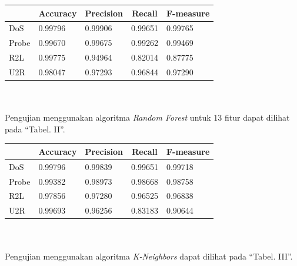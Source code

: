 \documentclass[conference]{IEEEtran}
\begin{document}
\noindent \begin{minipage}{\linewidth}
\begin{center}
\begin{tabular}{|l|l|l|l|l|}
\hline
\multicolumn{1}{|c|}{\textbf{}}&\multicolumn{1}{|c|}{\textbf{Accuracy}}&\multicolumn{1}{|c|}{\textbf{Precision}}&\multicolumn{1}{|c|}{\textbf{Recall}}&\multicolumn{1}{|c|}{\textbf{F-measure}} \\
\hline
DoS & 0.99796 & 0.99906 & 0.99651 & 0.99765\\
\hline
Probe & 0.99670 & 0.99675 & 0.99262 & 0.99469\\
\hline
R2L & 0.99775 & 0.94964 & 0.82014 & 0.87775\\
\hline
U2R & 0.98047 & 0.97293 & 0.96844 & 0.97290\\
\hline
\end{tabular}
\label{tab1}
\end{center}
\end{minipage}\\ \\

\noindent Pengujian menggunakan algoritma \emph{Random Forest} untuk 13 fitur dapat dilihat pada ``Tabel. II''.\vspace{6pt}

\noindent \begin{minipage}{\linewidth}
\begin{center}
\begin{tabular}{|l|l|l|l|l|}
\hline
\multicolumn{1}{|c|}{\textbf{}}&\multicolumn{1}{|c|}{\textbf{Accuracy}}&\multicolumn{1}{|c|}{\textbf{Precision}}&\multicolumn{1}{|c|}{\textbf{Recall}}&\multicolumn{1}{|c|}{\textbf{F-measure}} \\
\hline
DoS & 0.99796 & 0.99839 & 0.99651 & 0.99718\\
\hline
Probe & 0.99382 & 0.98973 & 0.98668 & 0.98758\\
\hline
R2L & 0.97856 & 0.97280 & 0.96525 & 0.96838\\
\hline
U2R & 0.99693 & 0.96256 & 0.83183 & 0.90644\\
\hline
\end{tabular}
\label{tab2}
\end{center}
\end{minipage}\\ \\

\noindent Pengujian menggunakan algoritma \emph{K-Neighbors} dapat dilihat pada ``Tabel. III''.\vspace{6pt}
\end{document}
